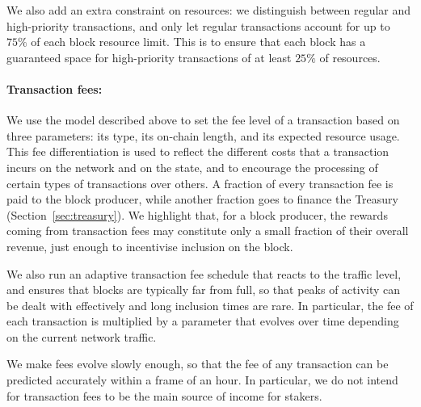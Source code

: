 We also add an extra constraint on resources: we distinguish between regular and high-priority transactions, and only let regular transactions account for up to $75\%$ of each block resource limit. This is to ensure that each block has a guaranteed space for high-priority transactions of at least $25\%$ of resources.

\paragraph{Transaction fees:} We use the model described above to set the fee level of a transaction based on three parameters: its type, its on-chain length, and its expected resource usage. This fee differentiation is used to reflect the different costs that a transaction incurs on the network and on the state, and to encourage the processing of certain types of transactions over others. A fraction of every transaction fee is paid to the block producer, while another fraction goes to finance the Treasury (Section~\ref{sec:treasury}). We highlight that, for a block producer, the rewards coming from transaction fees may constitute only a small fraction of their overall revenue, just enough to incentivise inclusion on the block.

We also run an adaptive transaction fee schedule that reacts to the traffic level, and ensures that blocks are typically far from full, so that peaks of activity can be dealt with effectively and long inclusion times are rare. In particular, the fee of each transaction is multiplied by a parameter that evolves over time depending on the current network traffic. 

 

We make fees evolve slowly enough, so that the fee of any transaction can be predicted accurately within a frame of an hour. In particular, we do not intend for transaction fees to be the main source of income for stakers.



